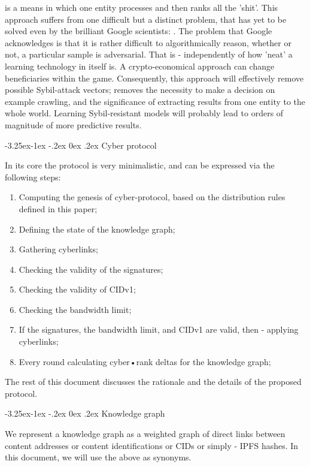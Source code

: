 \documentclass[8pt,oneside]{amsart}
\makeatletter
\newcommand{\linkgreen}[2]{\href{#1}{\color{green}{#2}}}
\renewcommand\subsection{\@startsection{subsection}{2}{\z@}%
                                     {-3.25ex\@plus -1ex \@minus -.2ex}%
                                     {0ex \@plus .2ex}%
                                     {\play\Large}}%
\newcommand{\titleSection}[1]{\subsection{#1}}
\makeatother
\begin{document}
\begin{Abstract}
\linkgreen{https://ipfs.io/ipfs/QmeS4LjoL1iMNRGuyYSx78RAtubTT2bioSGnsvoaupcHR6}{The current architecture of search engines} is a means in which one entity processes and then ranks all the 'shit'. This approach suffers from one difficult but a distinct problem, that has yet to be solved even by the brilliant Google scientists: \linkgreen{https://ipfs.io/ipfs/QmNrAFz34SLqkzhSg4wAYYJeokfJU5hBEpkT4hPRi226y9}{the adversarial example problem}. The problem that Google acknowledges is that it is rather difficult to algorithmically reason, whether or not, a particular sample is adversarial. That is - independently of how 'neat' a learning technology in itself is. A crypto-economical approach can change beneficiaries within the game. Consequently, this approach will effectively remove possible Sybil-attack vectors; removes the necessity to make a decision on example crawling, and the significance of extracting results from one entity to the whole world. Learning Sybil-resistant models will probably lead to orders of magnitude of more predictive results.

\titleSection{Cyber protocol}\label{Cyber protocol}

In its core the protocol is very minimalistic, and can be expressed via the following steps:

\begin{enumerate}[nosep]
\item Computing the genesis of cyber-protocol, based on the distribution rules defined in this paper;
\item Defining the state of the knowledge graph;
\item Gathering cyberlinks;
\item Checking the validity of the signatures;
\item Checking the validity of CIDv1;
\item Checking the bandwidth limit;
\item If the signatures, the bandwidth limit, and CIDv1 are valid, then - applying cyberlinks;
\item Every round calculating cyber•rank deltas for the knowledge graph;
\end{enumerate}

The rest of this document discusses the rationale and the details of the proposed protocol.

\titleSection{Knowledge graph}\label{knowledge graph}

We represent a knowledge graph as a weighted graph of direct links between content addresses or content identifications or CIDs or simply - IPFS hashes. In this document, we will use the above as synonyms.


\end{Abstract}
\end{document}

